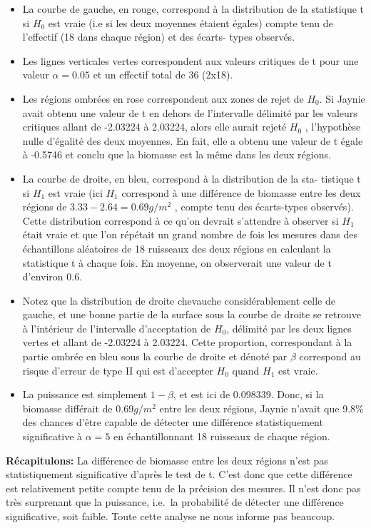 \documentclass[12pt,]{book}
\providecommand{\tightlist}{%
  \setlength{\itemsep}{0pt}\setlength{\parskip}{0pt}}
\begin{document}
\begin{itemize}
\tightlist
\item
  La courbe de gauche, en rouge, correspond à la distribution de la statistique t si \(H_0\) est vraie (i.e si les deux moyennes étaient égales) compte tenu de l'effectif (18 dans chaque région) et des écarts- types observés.
\item
  Les lignes verticales vertes correspondent aux valeurs critiques de t pour une valeur \(\alpha = 0.05\) et un effectif total de 36 (2x18).
\item
  Les régions ombrées en rose correspondent aux zones de rejet de \(H_0\).
  Si Jaynie avait obtenu une valeur de t en dehors de l'intervalle délimité par les valeurs critiques allant de -2.03224 à 2.03224, alors elle aurait rejeté \(H_0\) , l'hypothèse nulle d'égalité des deux moyennes.
  En fait, elle a obtenu une valeur de t égale à -0.5746 et conclu que la biomasse est la même dans les deux régions.
\item
  La courbe de droite, en bleu, correspond à la distribution de la sta- tistique t si \(H_1\) est vraie (ici \(H_1\) correspond à une différence de biomasse entre les deux régions de \(3.33-2.64=0.69g/m^2\) , compte tenu des écarts-types observés).
  Cette distribution correspond à ce qu'on devrait s'attendre à observer si \(H_1\) était vraie et que l'on répétait un grand nombre de fois les mesures dans des échantillons aléatoires de 18 ruisseaux des deux régions en calculant la statistique t à chaque fois.
  En moyenne, on observerait une valeur de t d'environ 0.6.
\item
  Notez que la distribution de droite chevauche considérablement celle de gauche, et une bonne partie de la surface sous la courbe de droite se retrouve à l'intérieur de l'intervalle d'acceptation de \(H_0\), délimité par les deux lignes vertes et allant de -2.03224 à 2.03224.
  Cette proportion, correspondant à la partie ombrée en bleu sous la courbe de droite et dénoté par \(\beta\) correspond au risque d'erreur de type II qui est d'accepter \(H_0\) quand \(H_1\) est vraie.
\item
  La puissance est simplement \(1-\beta\), et est ici de 0.098339.
  Donc, si la biomasse différait de 0.69\(g/m^2\) entre les deux régions, Jaynie n'avait que 9.8\% des chances d'être capable de détecter une différence statistiquement significative à \(\alpha=5%
  \) en échantillonnant 18 ruisseaux de chaque région.
\end{itemize}

\textbf{Récapitulons:} La différence de biomasse entre les deux régions n'est pas statistiquement significative d'après le test de t.
C'est donc que cette différence est relativement petite compte tenu de la précision des mesures.
Il n'est donc pas très surprenant que la puissance, i.e.~la probabilité de détecter une différence significative, soit faible.
Toute cette analyse ne nous informe pas beaucoup.
\end{document}
